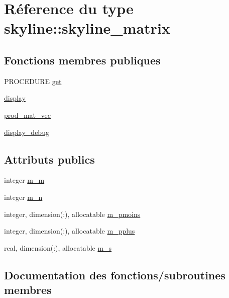 \hypertarget{structskyline_1_1skyline__matrix}{}\section{Réference du type skyline\+:\+:skyline\+\_\+matrix}
\label{structskyline_1_1skyline__matrix}
\subsection*{Fonctions membres publiques}
\begin{DoxyCompactItemize}
\item 
P\+R\+O\+C\+E\+D\+U\+RE \hyperlink{structskyline_1_1skyline__matrix_a3b8d47decbf713171eb82625a51fbcd1}{get}
\item 
\hyperlink{structskyline_1_1skyline__matrix_ab03e03935f5904ed8f75d303c0bd291a}{display}
\item 
\hyperlink{structskyline_1_1skyline__matrix_ae32226cd0b3b93e3cb1ec3757642eb5e}{prod\+\_\+mat\+\_\+vec}
\item 
\hyperlink{structskyline_1_1skyline__matrix_a7b5a1b7bffbef0cd9a1f39812a95c835}{display\+\_\+debug}
\end{DoxyCompactItemize}
\subsection*{Attributs publics}
\begin{DoxyCompactItemize}
\item 
integer \hyperlink{structskyline_1_1skyline__matrix_a5a4b43ae751ef50d42248106ff639e9b}{m\+\_\+m}
\item 
integer \hyperlink{structskyline_1_1skyline__matrix_a7ba587a5f9c0ecbbf2b4f66210354c69}{m\+\_\+n}
\item 
integer, dimension(\+:), allocatable \hyperlink{structskyline_1_1skyline__matrix_a82b8f867967e8fe2bc7106e2e41025fc}{m\+\_\+pmoins}
\item 
integer, dimension(\+:), allocatable \hyperlink{structskyline_1_1skyline__matrix_aece459142907a20cb11f6b881f21e3a2}{m\+\_\+pplus}
\item 
real, dimension(\+:), allocatable \hyperlink{structskyline_1_1skyline__matrix_ad8c333b80461be7faf047a603edd445a}{m\+\_\+s}
\end{DoxyCompactItemize}


\subsection{Documentation des fonctions/subroutines membres}
\mbox{\label{structskyline_1_1skyline__matrix_ab03e03935f5904ed8f75d303c0bd291a}} 
